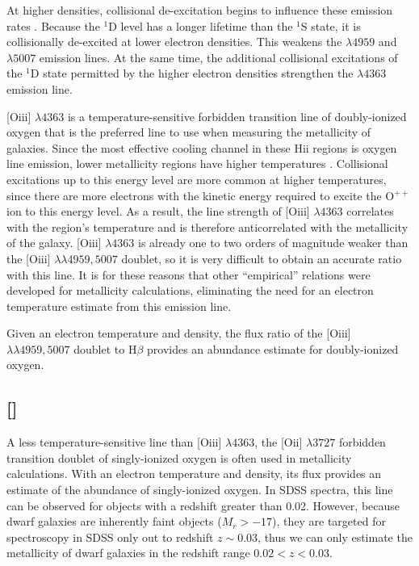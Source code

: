 At higher densities, collisional de-excitation begins to influence these 
emission rates \citep{Osterbrock89}.  Because the $^1$D level has a longer 
lifetime than the $^1$S state, it is collisionally de-excited at lower electron 
densities.  This weakens the $\lambda 4959$ and $\lambda 5007$ emission lines.  
At the same time, the additional collisional excitations of the $^1$D state 
permitted by the higher electron densities strengthen the $\lambda 4363$ 
emission line.

[O{\sc iii}] $\lambda 4363$ is a temperature-sensitive forbidden transition line 
of doubly-ionized oxygen that is the preferred line to use when measuring the 
metallicity of galaxies.  Since the most effective cooling channel in these 
H{\sc ii} regions is oxygen line emission, lower metallicity regions have higher 
temperatures  \citep{Saintonge07}.  Collisional excitations up to this energy 
level are more common at higher temperatures, since there are more electrons 
with the kinetic energy required to excite the O$^{++}$ ion to this energy 
level.  As a result, the line strength of [O{\sc iii}] $\lambda 4363$ correlates 
with the region's temperature and is therefore anticorrelated with the 
metallicity of the galaxy.  [O{\sc iii}] $\lambda 4363$ is already one to two 
orders of magnitude weaker than the [O{\sc iii}] $\lambda \lambda 4959, 5007$ 
doublet, so it is very difficult to obtain an accurate ratio with this line.  It 
is for these reasons that other ``empirical'' relations were developed for 
metallicity calculations, eliminating the need for an electron temperature 
estimate from this emission line.

Given an electron temperature and density, the flux ratio of the [O{\sc iii}] 
$\lambda \lambda 4959, 5007$ doublet to H$\beta$ provides an abundance estimate 
for doubly-ionized oxygen.



\subsection{[]}

A less temperature-sensitive line than [O{\sc iii}] $\lambda 4363$, the 
[O{\sc ii}] $\lambda 3727$ forbidden transition doublet of singly-ionized 
oxygen is often used in metallicity calculations.  With an electron temperature 
and density, its flux provides an estimate of the abundance of singly-ionized 
oxygen.  In SDSS spectra, this line can be observed for objects with a redshift 
greater than 0.02.  However, because dwarf galaxies are inherently faint objects 
($M_r > -17$), they are targeted for spectroscopy in SDSS only out to redshift 
$z\sim 0.03$, thus we can only estimate the metallicity of dwarf galaxies in the 
redshift range $0.02 < z < 0.03$.



